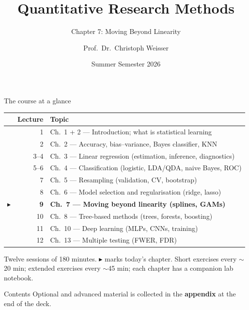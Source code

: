 \documentclass[aspectratio=169,11pt]{beamer}
\title{Quantitative Research Methods}
\subtitle{Chapter 7: Moving Beyond Linearity}
\author{Prof.\ Dr.\ Christoph Weisser}\institute{HSBI}
\date{Summer Semester 2026}\graphicspath{{images/}}
\begin{document}
\begin{frame}[plain]\titlepage\end{frame}

\begin{frame}{The course at a glance}
  \footnotesize
  \begin{center}
  \begin{tabular}{@{}c r l@{}}
    & \textbf{Lecture} & \textbf{Topic}\\
    \midrule
     & 1 & Ch.\ 1 + 2 --- Introduction; what is statistical learning \\
     & 2 & Ch.\ 2 --- Accuracy, bias--variance, Bayes classifier, KNN \\
     & 3--4 & Ch.\ 3 --- Linear regression (estimation, inference, diagnostics) \\
     & 5--6 & Ch.\ 4 --- Classification (logistic, LDA/QDA, naive Bayes, ROC) \\
     & 7 & Ch.\ 5 --- Resampling (validation, CV, bootstrap) \\
     & 8 & Ch.\ 6 --- Model selection and regularisation (ridge, lasso) \\
    $\blacktriangleright$ & \textbf{9} & \textbf{Ch.\ 7 --- Moving beyond linearity (splines, GAMs)} \\
     & 10 & Ch.\ 8 --- Tree-based methods (trees, forests, boosting) \\
     & 11 & Ch.\ 10 --- Deep learning (MLPs, CNNs, training) \\
     & 12 & Ch.\ 13 --- Multiple testing (FWER, FDR) \\
  \end{tabular}
  \end{center}
  \vspace{2pt}
  {\scriptsize Twelve sessions of 180 minutes. $\blacktriangleright$ marks today's chapter. Short exercises every $\sim$20 min; extended exercises every $\sim$45 min; each chapter has a companion lab notebook.}
\end{frame}


\begin{frame}{Contents}\small
  \tableofcontents[hideallsubsections]
  \vfill
  {\tiny Optional and advanced material is collected in the \textbf{appendix} at the end of the deck.}
\end{frame}
\end{document}
